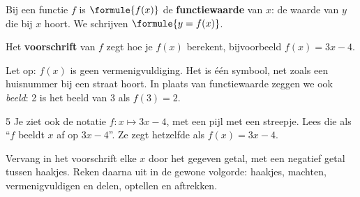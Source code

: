 \begin{theorie}
Bij een functie $f$ is $\formule{f(x)}$ de \textbf{\textcolor{accent}{functiewaarde}} van $x$: de waarde van $y$ die bij $x$ hoort. We schrijven $\formule{y = f(x)}$.

\vspace{1mm}
Het \textbf{\textcolor{accent}{voorschrift}} van $f$ zegt hoe je $f(x)$ berekent, bijvoorbeeld $f(x) = 3x - 4$.
\end{theorie}

Let op: $f(x)$ is geen vermenigvuldiging. Het is één symbool, net zoals een huisnummer bij een straat hoort. In plaats van functiewaarde zeggen we ook \textit{beeld}: 2 is het beeld van 3 als $f(3) = 2$.

\begin{alleenvoor}{5}
Je ziet ook de notatie $f: x \mapsto 3x - 4$, met een pijl met een streepje. Lees die als ``$f$ beeldt $x$ af op $3x - 4$''. Ze zegt hetzelfde als $f(x) = 3x - 4$.
\end{alleenvoor}



\begin{werkwijze}
Vervang in het voorschrift elke $x$ door het gegeven getal, met een negatief getal tussen haakjes. Reken daarna uit in de gewone volgorde: haakjes, machten, vermenigvuldigen en delen, optellen en aftrekken.
\end{werkwijze}


